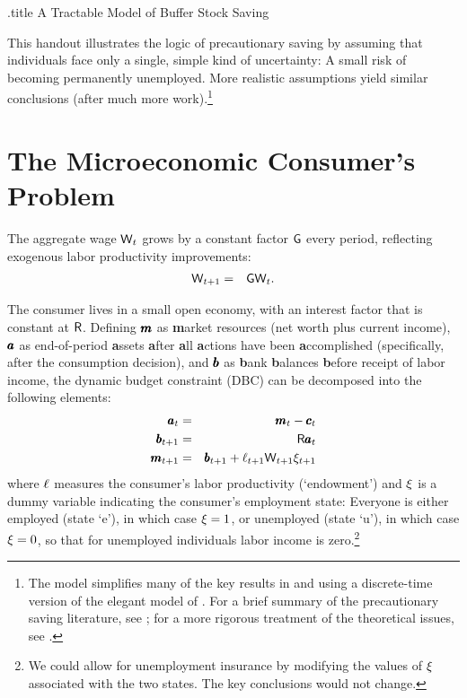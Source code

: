 \documentclass{handout}
\begin{document}
\handoutHeader

\begin{verbatimwrite}{\jobname.title}
A Tractable Model of Buffer Stock Saving
\end{verbatimwrite}

\handoutNameMake


This handout illustrates the logic of precautionary saving by assuming
that individuals face only a single, simple kind of uncertainty: A small risk of becoming permanently unemployed.  More realistic assumptions yield similar conclusions (after much more work).\footnote{The model simplifies many of the key results in \cite{carroll:brookings} and \cite{carroll:bslcpih} using a  discrete-time version of the elegant model of \cite{toche:urisk}.
  For a brief summary of the precautionary saving literature, see
  \cite{CarrollKimballPSPW}; for a more rigorous   treatment of the theoretical issues, see \cite{carrollBSTheory}.}

\section{The Microeconomic Consumer's Problem}
The aggregate wage $\mathsf{W}_{t}$ grows
by a constant factor $\mathsf{G}$ every period, reflecting exogenous labor productivity improvements:
\begin{eqnarray}
        \mathsf{W}_{t+1} & = & \mathsf{G} \mathsf{W}_{t}.
\end{eqnarray}

The consumer lives in a small open economy, with an interest factor that is constant at $\mathsf{R}$.  Defining $\pmb{m}$ as
{\bf m}arket resources (net worth plus current income), $\pmb{a}$ as
end-of-period {\bf a}ssets {\bf a}fter {\bf a}ll {\bf a}ctions have been {\bf a}ccomplished
(specifically, after the consumption decision), and $\pmb{b}$ as {\bf b}ank
{\bf b}alances {\bf b}efore receipt of labor income, the dynamic budget constraint (DBC) can be decomposed into the
following elements:
\begin{eqnarray}
    \pmb{a}_{t} & = & \pmb{m}_{t}-\pmb{c}_{t}
\\  \pmb{b}_{t+1} & = & \mathsf{R} \pmb{a}_{t}
\\  \pmb{m}_{t+1} & = & \pmb{b}_{t+1}+\ell_{t+1}\mathsf{W}_{t+1}\xi_{t+1}  \label{eq:DBC}
\end{eqnarray}
where $\ell$ measures the consumer's labor productivity
(`endowment') and $\xi$ is a dummy variable indicating the
consumer's employment state: Everyone is either
employed (state `e'), in which case $\xi = 1$, or unemployed
(state `u'), in which case $\xi=0$, so that for unemployed
individuals labor income is zero.\footnote{We could allow for
  unemployment insurance by modifying the values of $\xi$
  associated with the two states.  The key conclusions would not
  change.}
\end{document}
